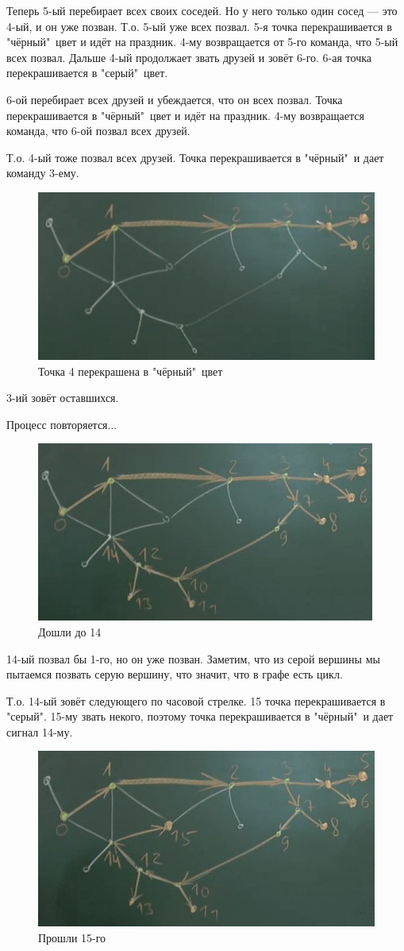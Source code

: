 \documentclass[a4paper,12pt]{article}
\theoremstyle{plain} %
\theoremstyle{definition} %
\theoremstyle{remark} %
\begin{document}
Теперь 5-ый перебирает всех своих соседей. Но у него только один сосед --- это 4-ый, и он уже позван. Т.о. 5-ый уже всех позвал. 5-я точка перекрашивается в "чёрный"\ цвет и идёт на праздник. 4-му возвращается от 5-го команда, что 5-ый всех позвал. Дальше 4-ый продолжает звать друзей и зовёт 6-го. 6-ая точка перекрашивается в "серый"\ цвет.

6-ой перебирает всех друзей и убеждается, что он всех позвал. Точка перекрашивается в "чёрный"\ цвет и идёт на праздник. 4-му возвращается команда, что 6-ой позвал всех друзей.

Т.о. 4-ый тоже позвал всех друзей. Точка перекрашивается в "чёрный"\ и дает команду 3-ему.

\begin{figure}[h!]
	\centering
	\includegraphics[width=0.5\linewidth]{alg5}
	\caption{Точка 4 перекрашена в "чёрный"\ цвет}
\end{figure}

3-ий зовёт оставшихся.

Процесс повторяется...
\vspace{10cm}
\begin{figure}[h!]
	\centering
	\includegraphics[width=0.5\linewidth]{alg6}
	\caption{Дошли до 14}
\end{figure}

14-ый позвал бы 1-го, но он уже позван. Заметим, что из серой вершины мы пытаемся позвать серую вершину, что значит, что в графе есть цикл.

Т.о. 14-ый зовёт следующего по часовой стрелке. 15 точка перекрашивается в "серый". 15-му звать некого, поэтому точка перекрашивается в "чёрный"\ и дает сигнал 14-му.

\begin{figure}[h!]
	\centering
	\includegraphics[width=0.5\linewidth]{alg7}
	\caption{Прошли 15-го}
\end{figure}
\end{document}
